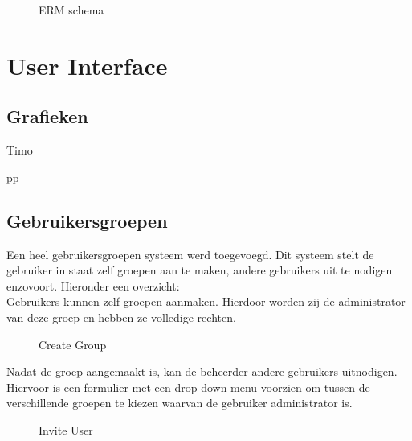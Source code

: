 \documentclass[11pt]{article}
\begin{document}
\begin{figure}[h!]
	\begin{center}


	\caption{ERM schema}
	\label{fig:speler}
	\end{center}
\end{figure}
\section{User Interface}


\subsection{Grafieken}

Timo




pp



\subsection{Gebruikersgroepen}

Een heel gebruikersgroepen systeem werd toegevoegd.  Dit systeem stelt de gebruiker in staat zelf groepen aan te maken, andere gebruikers uit te nodigen enzovoort.  Hieronder een overzicht:\\

Gebruikers kunnen zelf groepen aanmaken.  Hierdoor worden zij de administrator van deze groep en hebben ze volledige rechten.\\

\begin{figure}[h!]
	\begin{center}


	\caption{Create Group}
	\label{fig:createGroup}
	\end{center}
\end{figure}

Nadat de groep aangemaakt is, kan de beheerder andere gebruikers uitnodigen.  Hiervoor is een formulier met een drop-down menu voorzien om tussen de verschillende groepen te kiezen waarvan de gebruiker administrator is.\\

\begin{figure}[h!]
	\begin{center}


	\caption{Invite User}
	\label{fig:inviteUser}
	\end{center}
\end{figure}
\end{document}
